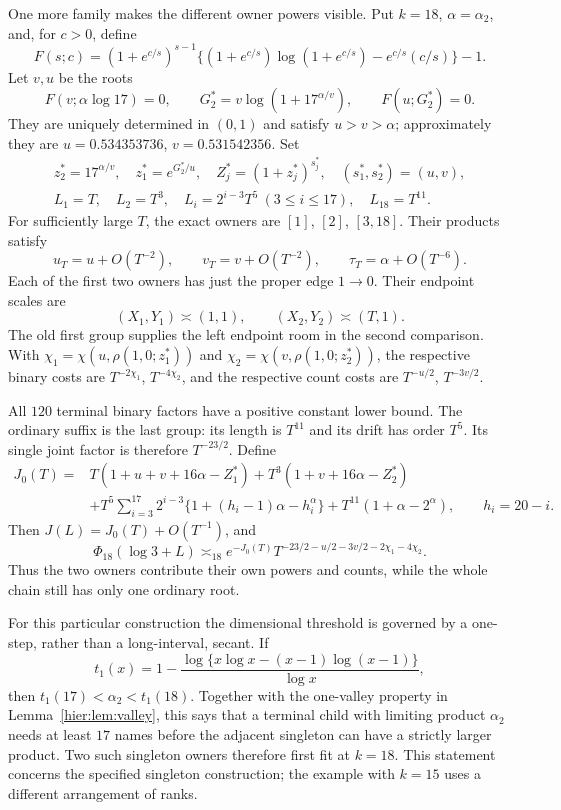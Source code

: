 One more family makes the different owner powers visible.  Put
\(k=18\), \(\alpha=\alpha_2\), and, for \(c>0\), define
\[
 F(s;c)=(1+e^{c/s})^{s-1}
       \{(1+e^{c/s})\log(1+e^{c/s})-e^{c/s}(c/s)\}-1.
\]
Let \(v,u\) be the roots
\begin{equation}
 F(v;\alpha\log17)=0,\qquad
 G_2^*=v\log(1+17^{\alpha/v}),\qquad F(u;G_2^*)=0.
 \label{ex:multi-roots}
\end{equation}
They are uniquely determined in \((0,1)\) and satisfy
\(u>v>\alpha\); approximately they are
\(u=0.534353736\), \(v=0.531542356\).
Set
\begin{gather}
 z_2^*=17^{\alpha/v},\quad z_1^*=e^{G_2^*/u},\quad
 Z_j^*=(1+z_j^*)^{s_j^*},\quad (s_1^*,s_2^*)=(u,v),\nonumber\\
 L_1=T,\quad L_2=T^3,\quad
 L_i=2^{i-3}T^5\ (3\le i\le17),\quad L_{18}=T^{11}.
 \label{ex:multi-lengths}
\end{gather}
For sufficiently large \(T\), the exact owners are
\([1]\), \([2]\), \([3,18]\).  Their products satisfy
\[
 u_T=u+O(T^{-2}),\qquad v_T=v+O(T^{-2}),\qquad
 \tau_T=\alpha+O(T^{-6}).
\]
Each of the first two owners has just the proper edge \(1\to0\).
Their endpoint scales are
\[
 (X_1,Y_1)\asymp(1,1),\qquad
 (X_2,Y_2)\asymp(T,1).
\]
The old first group supplies the left endpoint room in the second
comparison.  With
\(\chi_1=\chi(u,\rho(1,0;z_1^*))\) and
\(\chi_2=\chi(v,\rho(1,0;z_2^*))\), the respective binary costs are
\(T^{-2\chi_1}\), \(T^{-4\chi_2}\), and the respective count costs
are \(T^{-u/2}\), \(T^{-3v/2}\).

All \(120\) terminal binary factors have a positive constant lower
bound.  The ordinary suffix is the last group: its length is \(T^{11}\)
and its drift has order \(T^5\).  Its single joint factor is therefore
\(T^{-23/2}\).  Define
\begin{align}
 J_0(T)={}&T(1+u+v+16\alpha-Z_1^*)
       +T^3(1+v+16\alpha-Z_2^*)\nonumber\\
 &+T^5\sum_{i=3}^{17}2^{i-3}
       \{1+(h_i-1)\alpha-h_i^\alpha\}
       +T^{11}(1+\alpha-2^\alpha),\qquad h_i=20-i.
 \label{ex:multi-rate}
\end{align}
Then \(J(L)=J_0(T)+O(T^{-1})\), and
\begin{equation}
 \Phi_{18}(\log3+L)\asymp_{18}
 e^{-J_0(T)}
 T^{-23/2-u/2-3v/2-2\chi_1-4\chi_2}.
 \label{ex:multi-answer}
\end{equation}
Thus the two owners contribute their own powers and counts, while the
whole chain still has only one ordinary root.

For this particular construction the dimensional threshold is governed
by a one-step, rather than a long-interval, secant.  If
\[
 t_1(x)=1-\frac{\log\{x\log x-(x-1)\log(x-1)\}}{\log x},
\]
then \(t_1(17)<\alpha_2<t_1(18)\).  Together with the one-valley
property in Lemma~\ref{hier:lem:valley}, this says that a terminal child
with limiting product \(\alpha_2\) needs at least \(17\) names before
the adjacent singleton can have a strictly larger product.  Two such
singleton owners therefore first fit at \(k=18\).  This
statement concerns the specified singleton construction; the
example with \(k=15\) uses a different arrangement of ranks.
